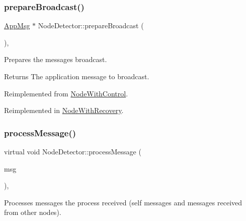 \mbox{\label{class_node_detector_af75cf37cc01fc51bc228a7a83c10cb97}} 
\subsubsection{\texorpdfstring{prepare\+Broadcast()}{prepareBroadcast()}}
{\footnotesize\ttfamily \hyperlink{class_app_msg}{App\+Msg} $\ast$ Node\+Detector\+::prepare\+Broadcast (\begin{DoxyParamCaption}{ }\end{DoxyParamCaption})\hspace{0.3cm}{\ttfamily [protected]}, {\ttfamily [virtual]}}



Prepares the message\textquotesingle{}s broadcast. 

\begin{DoxyReturn}{Returns}
The application message to broadcast. 
\end{DoxyReturn}


Reimplemented from \hyperlink{class_node_with_control_ab871014cf3f42d834f8d34ad5498174c}{Node\+With\+Control}.



Reimplemented in \hyperlink{class_node_with_recovery_a33d8e8775fd69cb647b38a54b36e1ebe}{Node\+With\+Recovery}.

\mbox{\label{class_node_detector_ab69432c6d3327a684845ec231826727e}} 
\subsubsection{\texorpdfstring{process\+Message()}{processMessage()}}
{\footnotesize\ttfamily virtual void Node\+Detector\+::process\+Message (\begin{DoxyParamCaption}\item[{c\+Message $\ast$}]{msg }\end{DoxyParamCaption})\hspace{0.3cm}{\ttfamily [protected]}, {}}



Processes messages the process received (self messages and messages received from other nodes). 



